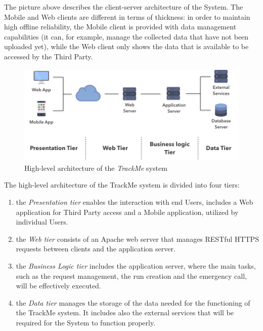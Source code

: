 \newpage

The picture above describes the client-server architecture of the System. The Mobile and Web clients are different in terms of thickness: in order to maintain high offline reliability, the Mobile client is provided with data management capabilities (it can, for example, manage the collected data that have not been uploaded yet), while the Web client only shows the data that is available to be accessed by the Third Party. 


\vspace{5mm}

\begin{figure}[H]
\includegraphics[scale=0.43,keepaspectratio]{./Pictures/high-level-basic.jpeg}
\centering
\caption{High-level architecture of the \textit{TrackMe} system}
\end{figure}

\vspace{5mm}

The high-level architecture of the TrackMe system is divided into four tiers:
\begin{enumerate}
\item the \textit{Presentation tier} enables the interaction with end Users, includes a Web application for Third Party access and a Mobile application, utilized by individual Users.
\item the \textit{Web tier} consists of an Apache web server that manages RESTful HTTPS requests between clients and the application server.
\item the \textit{Business Logic tier} includes the application server, where the main tasks, such as the request management, the run creation and the emergency call, will be effectively executed. 
\item the \textit{Data tier} manages the storage of the data needed for the functioning of the TrackMe system. It includes also the external services that will be required for the System to function properly.
\end{enumerate}

\newpage
